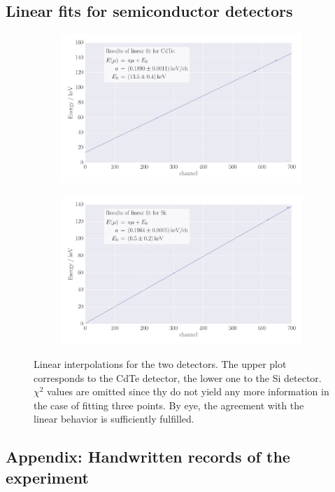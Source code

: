 \subsection{Linear fits for semiconductor detectors}
\label{sec:appendix_detector_calibration}
\begin{figure}
    \centering
    \begin{subfigure}[b]{\pltw}
        \includegraphics[width=1.0\linewidth]{figures/detector_calibration_CdTe}
        \caption{}
        \label{fig:detector_calibration_CdTe}
    \end{subfigure}
    \begin{subfigure}[b]{\pltw}
        \includegraphics[width=1.0\linewidth]{figures/detector_calibration_Si}
        \caption{}
        \label{fig:detector_calibration_Si}
    \end{subfigure}
    \caption{
        Linear interpolations for the two detectors. The upper plot 
        corresponds to the CdTe detector, the lower one to the Si detector. 
        $\chi^2$ values are omitted since thy do not yield any more information 
        in the case of fitting three points. By eye, the agreement with the linear 
        behavior is sufficiently fulfilled. 
        }
    \label{fig:detector_calibration}
\end{figure}
\subsection{Appendix: Handwritten records of the experiment}
    \label{sec:records_band_gap}
\clearpage

